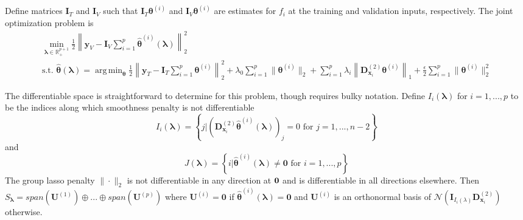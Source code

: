 \documentclass[12pt]{article}
\DeclareMathOperator*{\argmin}{arg\,min}
\begin{document}
Define matrices $\boldsymbol{I}_T$ and $\boldsymbol{I}_V$ such that $\boldsymbol I_T \boldsymbol{\theta}^{(i)}$ and $\boldsymbol I_V \boldsymbol{\theta}^{(i)}$ are estimates for $f_i$ at the training and validation inputs, respectively. The joint optimization problem is
\begin{equation}
\begin{array}{c}
\min_{\boldsymbol\lambda \in \mathbb{R}^{p+1}_{+}} \frac{1}{2}
\left \|
\boldsymbol{y}_V
- \boldsymbol{I}_V \sum_{i=1}^p \hat{\boldsymbol{\theta}}^{(i)}(\boldsymbol{\lambda})
\right \|^2_2 \\
\text{s.t. }
\hat{\boldsymbol{\theta}}(\boldsymbol{\lambda}) =
\argmin_{\boldsymbol{\theta}}
\frac{1}{2} \left \|
\boldsymbol{y}_T
- \boldsymbol{I}_T \sum_{i=1}^p \boldsymbol{\theta}^{(i)} \right \|^2_2
+ \lambda_0 \sum_{i=1}^p \| \boldsymbol{\theta}^{(i)} \|_2
+ \sum_{i=1}^p \lambda_i \left \| \boldsymbol{D}^{(2)}_{\boldsymbol{x}_i} \boldsymbol{\theta}^{(i)} \right \|_1
+ \frac{\epsilon}{2}  \sum_{i=1}^p \| \boldsymbol{\theta}^{(i)} \|_2^2
\end{array}
\label{aplmProblem}
\end{equation}


The differentiable space is straightforward to determine for this problem, though requires bulky notation. Define $I_i(\boldsymbol{\lambda})$ for $i=1,...,p$ to be the indices along which smoothness penalty is not differentiable
\begin{equation}
I_i(\boldsymbol{\lambda}) = \left \{j | \left (\boldsymbol{D}^{(2)}_{\boldsymbol{x}_i} \hat{\boldsymbol \theta}^{(i)}(\boldsymbol\lambda) \right )_j = 0 \text{ for } j=1,...,n-2 \right \}
\end{equation}
and
\begin{equation}
J(\boldsymbol{\lambda}) = \left \{ i | \hat{\boldsymbol \theta}^{(i)}(\boldsymbol\lambda) \ne \boldsymbol 0 \text{ for } i=1,...,p \right \}
\end{equation}
The group lasso penalty $\|\cdot\|_2$ is not differentiable in any direction at ${\bf 0}$ and is differentiable in all directions elsewhere. Then $S_{\boldsymbol \lambda} = span(\boldsymbol {U}^{(1)}) \oplus ... \oplus span(\boldsymbol {U}^{(p)}) $ where $\boldsymbol {U}^{(i)} = \boldsymbol{0}$ if $\hat{\boldsymbol \theta}^{(i)}(\boldsymbol\lambda) = \boldsymbol 0$ and $\boldsymbol {U}^{(i)}$ is an orthonormal basis of $\mathcal{N}(\boldsymbol{I}_{I_i(\lambda)}\boldsymbol{D}^{(2)}_{\boldsymbol{x}_i})$ otherwise.
\end{document}
